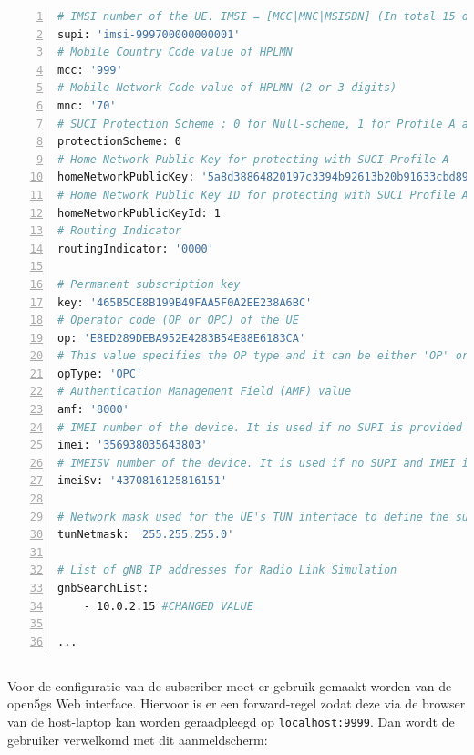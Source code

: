 \begin{lstlisting}[basicstyle=\small, frame=single, breaklines=true, postbreak=\mbox{\textcolor{red}{$\hookrightarrow$}\space}, escapeinside ={\%,}, escapechar={!}, numbers=left, language=sh, caption=UE configuratie]
# IMSI number of the UE. IMSI = [MCC|MNC|MSISDN] (In total 15 digits)
supi: 'imsi-999700000000001'
# Mobile Country Code value of HPLMN
mcc: '999'
# Mobile Network Code value of HPLMN (2 or 3 digits)
mnc: '70'
# SUCI Protection Scheme : 0 for Null-scheme, 1 for Profile A and 2 for Profile B
protectionScheme: 0
# Home Network Public Key for protecting with SUCI Profile A
homeNetworkPublicKey: '5a8d38864820197c3394b92613b20b91633cbd897119273bf8e4a6f4eec0a650'
# Home Network Public Key ID for protecting with SUCI Profile A
homeNetworkPublicKeyId: 1
# Routing Indicator
routingIndicator: '0000'

# Permanent subscription key
key: '465B5CE8B199B49FAA5F0A2EE238A6BC'
# Operator code (OP or OPC) of the UE
op: 'E8ED289DEBA952E4283B54E88E6183CA'
# This value specifies the OP type and it can be either 'OP' or 'OPC'
opType: 'OPC'
# Authentication Management Field (AMF) value
amf: '8000'
# IMEI number of the device. It is used if no SUPI is provided
imei: '356938035643803'
# IMEISV number of the device. It is used if no SUPI and IMEI is provided
imeiSv: '4370816125816151'

# Network mask used for the UE's TUN interface to define the subnet size
tunNetmask: '255.255.255.0'

# List of gNB IP addresses for Radio Link Simulation
gnbSearchList:
    - 10.0.2.15 #CHANGED VALUE

...
\end{lstlisting}

\subsection{}%
\label{sec:subscriber_config}%

Voor de configuratie van de subscriber moet er gebruik gemaakt worden van de \gls{open5gs} Web interface. Hiervoor is er een forward-regel zodat deze via de browser van de host-laptop kan worden geraadpleegd op \lstinline!localhost:9999!. Dan wordt de gebruiker verwelkomd met dit aanmeldscherm:

